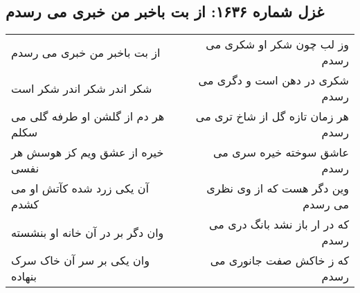 \begin{center}
\section*{غزل شماره ۱۶۳۶: از بت باخبر من خبری می رسدم}
\label{sec:1636}
\begin{longtable}{l p{0.5cm} r}
از بت باخبر من خبری می رسدم
&&
وز لب چون شکر او شکری می رسدم
\\
شکر اندر شکر اندر شکر است
&&
شکری در دهن است و دگری می رسدم
\\
هر دم از گلشن او طرفه گلی می سکلم
&&
هر زمان تازه گل از شاخ تری می رسدم
\\
خیره از عشق ویم کز هوسش هر نفسی
&&
عاشق سوخته خیره سری می رسدم
\\
آن یکی زرد شده کآتش او می کشدم
&&
وین دگر هست که از وی نظری می رسدم
\\
وان دگر بر در آن خانه او بنشسته
&&
که در ار باز نشد بانگ دری می رسدم
\\
وان یکی بر سر آن خاک سرک بنهاده
&&
که ز خاکش صفت جانوری می رسدم
\\
\end{longtable}
\end{center}
